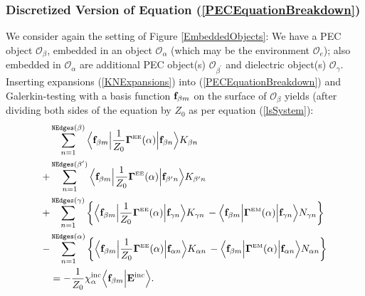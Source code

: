 \documentclass[dvips,letterpaper]{article}
\newcommand{\BG}{\boldsymbol{\Gamma}}
\begin{document}
\subsubsection*{Discretized Version of Equation 
                (\ref{PECEquationBreakdown})}

We consider again the setting of Figure \ref{EmbeddedObjects}:
We have a PEC object $\mathcal{O}_\beta$, embedded in an object
$\mathcal{O}_\alpha$ (which may be the environment 
$\mathcal{O}_e$); also embedded in $\mathcal{O}_\alpha$ are
additional PEC object(s) $\mathcal{O}_{\beta^\prime}$ and dielectric 
object(s) $\mathcal{O}_\gamma.$ 
Inserting expansions (\ref{KNExpansions}) 
into (\ref{PECEquationBreakdown})
and Galerkin-testing with a basis function $\mathbf{f}_{\beta m}$ on 
the surface of $\mathcal{O}_\beta$ yields 
(after dividing both 
sides of the equation by $Z_0$ as per equation (\ref{lsSystem}):
\begin{align}
&\sum_{n=1}^{\texttt{NEdges}(\beta)} 
   \Big\langle 
         \vb f_{\beta m} 
   \Big| \frac{1}{Z_0} \BG\supt{EE}(\alpha) \Big|
         \vb f_{\beta n}
   \Big\rangle 
         K_{\beta n}
\nn
+&\sum_{n=1}^{\texttt{NEdges}(\beta^\prime)} 
   \Big\langle 
         \vb f_{\beta m} 
   \Big| \frac{1}{Z_0} \BG\supt{EE}(\alpha) \Big| 
         \vb f_{\beta^\prime n}
   \Big\rangle 
         K_{\beta^\prime n}
\nn
+&\sum_{n=1}^{\texttt{NEdges}(\gamma)} \bigg\{
   \Big\langle 
         \vb f_{\beta m} 
   \Big| \frac{1}{Z_0} \BG\supt{EE}(\alpha) \Big| 
         \vb f_{\gamma n}
   \Big\rangle 
         K_{\gamma n}
   \,-
   \Big\langle 
         \vb f_{\beta m} 
   \Big| \BG\supt{EM}(\alpha) \Big| 
         \vb f_{\gamma n}
   \Big\rangle 
         N_{\gamma n}
  \bigg\}
\nn
-&\sum_{n=1}^{\texttt{NEdges}(\alpha)} \bigg\{
   \Big\langle 
         \vb f_{\beta m} 
   \Big| \frac{1}{Z_0} \BG\supt{EE}(\alpha) \Big| 
         \vb f_{\alpha n}
   \Big\rangle 
         K_{\alpha n}
   \,-
   \Big\langle 
         \vb f_{\beta m} 
   \Big| \BG\supt{EM}(\alpha) \Big| 
         \vb f_{\alpha n}
   \Big\rangle 
         N_{\alpha n}
  \bigg\}
\nn
&=-\frac{1}{Z_0} \chi_\alpha\sups{inc} 
   \Big\langle \vb f_{\beta m} \Big| \vb E\sups{inc} \Big\rangle.
 \label{DiscretizedPECEquation}
\end{align}
\end{document}
